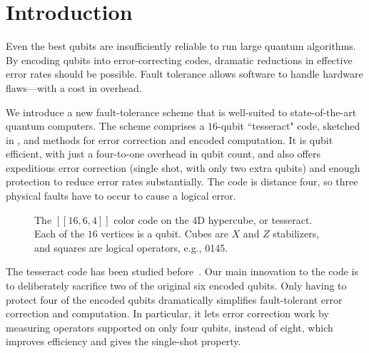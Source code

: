 \documentclass[10pt, twocolumn, aps, nofootinbib, longbibliography, nobibnotes, superscriptaddress]{revtex4-1} %
\begin{document}
\maketitle

\section{Introduction}

Even the best qubits are insufficiently reliable to run large quantum algorithms.  By encoding qubits into error-correcting codes, dramatic reductions in effective error rates should be possible.  
Fault tolerance allows software to handle hardware flaws---with a cost in overhead.  

We introduce a new fault-tolerance scheme that is well-suited to state-of-the-art quantum computers.  
The scheme comprises a $16$-qubit ``tesseract" code, sketched in , and methods for error correction and encoded computation.  It is qubit efficient, with just a four-to-one overhead in qubit count, and also offers expeditious error correction (single shot, with only two extra qubits) and enough protection to reduce error rates substantially.  The code is distance four, %
so three physical faults have to occur to cause a logical error.  %

\begin{figure}[b]
{}
\caption{
The $[[16,6,4]]$ color code on the 4D hypercube, or tesseract. %
Each of the $16$ vertices is a qubit.  Cubes are $X$ and $Z$ stabilizers, and squares are logical operators, e.g., 0145.  
}
\label{f:tesseract}
\end{figure}

The %
tesseract code has been studied before~\cite{delfosse2020short, PrabhuReichardt24code16}.  Our main innovation to the code is to deliberately sacrifice two of the original six encoded qubits.  Only having to protect four of the encoded qubits dramatically simplifies fault-tolerant error correction and computation.  
In particular, it lets error correction work by measuring operators supported on only four qubits, instead of eight, which improves efficiency and gives the single-shot property.  
\end{document}
